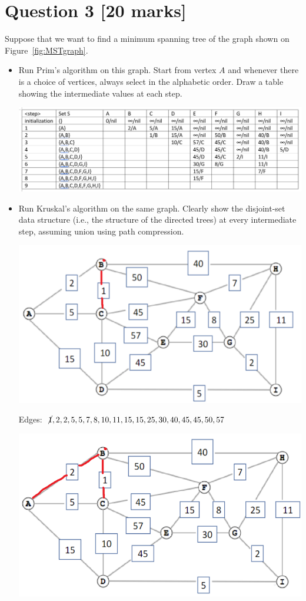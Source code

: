 \documentclass[11pt]{article}
\begin{document}
%
\section*{Question 3 [20 marks]}
Suppose that we want to find a minimum spanning tree of the graph shown on Figure~\ref{fig:MSTgraph}.
\begin{itemize}
	\item Run Prim's algorithm on this graph. Start from vertex $A$ and whenever there is a choice of vertices, always select in the alphabetic order. Draw a table showing the intermediate values at each step.
	
	\includegraphics[width=\textwidth]{PRIV.png}
	
	\item Run Kruskal's algorithm on the same graph. Clearly show the disjoint-set data structure (i.e., the structure of the directed trees) at every intermediate step, assuming union using path compression.
	
	\includegraphics[width=\textwidth]{1.png}

	Edges: $\cancel{1},2,2,5,5,7,8,10,11,15,15,25,30,40,45,45,50,57$

	\includegraphics[width=\textwidth]{2.png}


\end{itemize}
\end{document}
